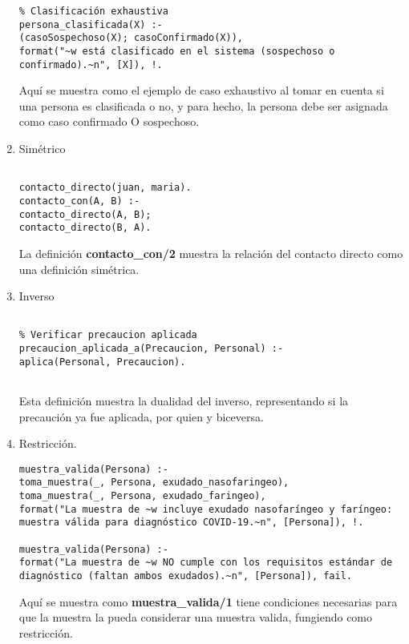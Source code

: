 \documentclass[11pt, letterpaper]{article}
\begin{document}
\begin{enumerate}
\begin{verbatim}
% Clasificación exhaustiva
persona_clasificada(X) :-
(casoSospechoso(X); casoConfirmado(X)),
format("~w está clasificado en el sistema (sospechoso o confirmado).~n", [X]), !.
\end{verbatim}	


Aquí se muestra como el ejemplo de caso exhaustivo al tomar en cuenta si una persona es clasificada o no, y para hecho, la persona debe ser asignada como caso confirmado O sospechoso.

		\item 		Simétrico

\begin{verbatim}
	
contacto_directo(juan, maria).
contacto_con(A, B) :-
contacto_directo(A, B);
contacto_directo(B, A).

\end{verbatim}	

La definición \textbf{contacto\_con/2} muestra la relación del contacto directo como una definición simétrica.
 		
		
		\item		Inverso
\begin{verbatim}
		
% Verificar precaucion aplicada
precaucion_aplicada_a(Precaucion, Personal) :-
aplica(Personal, Precaucion).
	
\end{verbatim}		
	
Esta definición muestra la dualidad del inverso, representando si la precaución ya fue aplicada, por quien y biceversa.	

\newpage
	
		\item		Restricción.
		
\begin{verbatim}
muestra_valida(Persona) :-
toma_muestra(_, Persona, exudado_nasofaringeo),
toma_muestra(_, Persona, exudado_faringeo),
format("La muestra de ~w incluye exudado nasofaríngeo y faríngeo: muestra válida para diagnóstico COVID-19.~n", [Persona]), !.

muestra_valida(Persona) :-
format("La muestra de ~w NO cumple con los requisitos estándar de diagnóstico (faltan ambos exudados).~n", [Persona]), fail.

\end{verbatim}

Aquí se muestra como \textbf{muestra\_valida/1} tiene condiciones necesarias para que la muestra la pueda considerar una muestra valida, fungiendo como restricción.
		

\end{enumerate}
\end{document}

